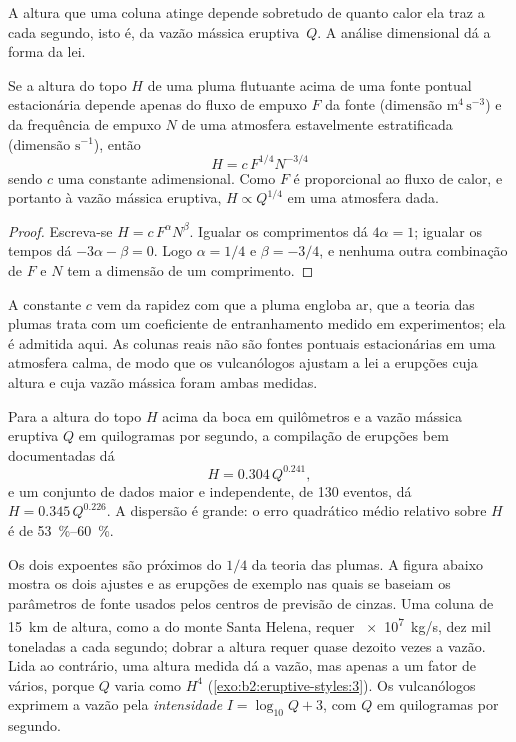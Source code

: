 A altura que uma coluna atinge depende sobretudo de quanto calor ela traz a cada
segundo, isto é, da vazão mássica eruptiva~$Q$. A análise dimensional dá a
forma da lei.

\begin{proposition}\label{prop:b2:eruptive-styles:plume}
Se a altura do topo $H$ de uma pluma flutuante acima de uma fonte pontual estacionária depende apenas
do fluxo de empuxo $F$ da fonte (dimensão $\mathrm{m^4\,s^{-3}}$) e da
frequência de empuxo $N$ de uma atmosfera estavelmente estratificada (dimensão
$\mathrm{s^{-1}}$), então
\[
H = c\,F^{1/4}N^{-3/4}
\]
sendo $c$ uma constante adimensional. Como $F$ é proporcional ao fluxo de calor, e portanto
à vazão mássica eruptiva, $H \propto Q^{1/4}$ em uma atmosfera dada.
\end{proposition}

\begin{proof}
Escreva-se $H = c\,F^{\alpha}N^{\beta}$. Igualar os comprimentos dá $4\alpha = 1$; igualar os
tempos dá $-3\alpha - \beta = 0$. Logo $\alpha = 1/4$ e $\beta = -3/4$, e nenhuma
outra combinação de $F$ e $N$ tem a dimensão de um comprimento.
\end{proof}

A constante $c$ vem da rapidez com que a pluma engloba ar, que a teoria das plumas
trata com um coeficiente de entranhamento medido em experimentos; ela é admitida
aqui. As colunas reais não são fontes pontuais estacionárias em uma atmosfera calma, de modo que
os vulcanólogos ajustam a lei a erupções cuja altura e cuja vazão mássica foram
ambas medidas.

\begin{proposition}\label{prop:b2:eruptive-styles:mastin}
Para a altura do topo $H$ acima da boca em quilômetros e a vazão mássica eruptiva
$Q$ em quilogramas por segundo, a compilação de erupções bem documentadas dá
\[
H = 0.304\,Q^{0.241},
\]
e um conjunto de dados maior e independente, de 130 eventos, dá $H = 0.345\,Q^{0.226}$.
A dispersão é grande: o erro quadrático médio relativo sobre $H$ é de
\qtyrange{53}{60}{\percent}.
\end{proposition}
\admitted

Os dois expoentes são próximos do $1/4$ da teoria das plumas. A figura abaixo mostra
os dois ajustes e as erupções de exemplo nas quais se baseiam os parâmetros de fonte usados pelos
centros de previsão de cinzas. Uma coluna de \qty{15}{km} de altura, como a do monte
Santa Helena, requer \qty{e7}{kg/s}, dez mil toneladas a cada segundo; dobrar a
altura requer quase dezoito vezes a vazão. Lida ao contrário, uma altura medida dá
a vazão, mas apenas a um fator de vários, porque $Q$ varia como $H^4$
(\cref{exo:b2:eruptive-styles:3}). Os vulcanólogos exprimem a vazão pela \emph{intensidade} $I =
\log_{10}Q + 3$, com $Q$ em quilogramas por segundo.

